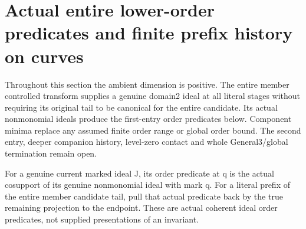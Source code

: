 \section{Actual entire lower-order predicates and finite prefix history on curves}

Throughout this section the ambient dimension is positive. The entire member controlled transform supplies a genuine domain2 ideal at
all literal stages without requiring its original tail to be canonical for the
entire candidate. Its actual nonmonomial ideals produce the first-entry order
predicates below. Component minima replace any assumed finite order range or
global order bound. The second entry, deeper companion history, level-zero
contact and whole General3/global termination remain open.

\begin{definition}
\label{hir:member-lower-order-actual-predicate}
\leanok
For a genuine current marked ideal J, its order predicate at q is the actual
cosupport of its genuine nonmonomial ideal with mark q. For a literal prefix
of the entire member candidate tail, pull that actual predicate back by the
true remaining projection to the endpoint. These are actual coherent ideal
order predicates, not supplied presentations of an invariant.
\end{definition}

